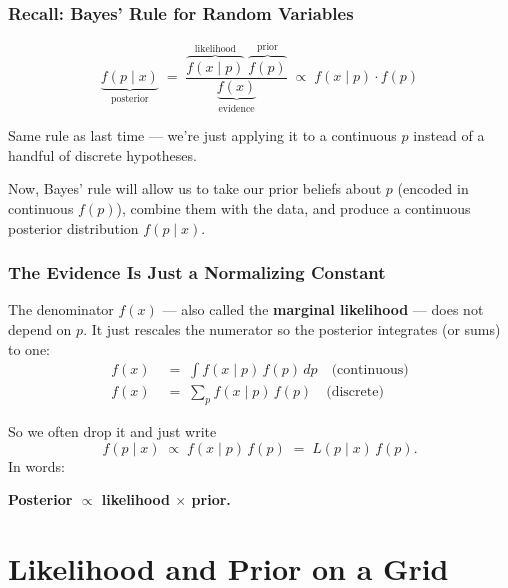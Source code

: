 \documentclass[slidestop,compress,mathserif]{beamer}
\begin{document}
\begin{frame}
    \frametitle{Recall: Bayes' Rule for Random Variables}
    \[
    \underbrace{f(p \mid x)}_{\text{posterior}} \;=\; \frac{\overbrace{f(x \mid p)}^{\text{likelihood}}\;\overbrace{f(p)}^{\text{prior}}}{\underbrace{f(x)}_{\text{evidence}}} \;\propto\; f(x\mid p)\cdot f(p)
    \]
    \pause

    \medskip
    Same rule as last time --- we're just applying it to a continuous $p$ instead of a handful of discrete hypotheses.

    \pause
    \medskip
    Now, Bayes' rule will allow us to take our prior beliefs about $p$ (encoded in continuous $f(p)$), combine them with the data, and produce a continuous posterior distribution $f(p \mid x)$.
\end{frame}

\begin{frame}
\frametitle{The Evidence Is Just a Normalizing Constant}

The denominator $f(x)$ --- also called the \textbf{marginal likelihood} --- does not depend on $p$. It just rescales the numerator so the posterior integrates (or sums) to one:
\begin{align*}
f(x) &\;=\; \int f(x \mid p)\, f(p)\, dp \quad \text{(continuous)} \\
 f(x) &\;=\; \sum_p f(x \mid p)\, f(p) \quad \text{(discrete)}
\end{align*}

\pause
\medskip

So we often drop it and just write
\[
f(p \mid x) \;\propto\; f(x \mid p)\, f(p) \;=\; L(p \mid x)\, f(p).
\]
In words:
\begin{center}
\textbf{Posterior $\propto$ likelihood $\times$ prior.}
\end{center}

\end{frame}

\section{Likelihood and Prior on a Grid}
\end{document}
